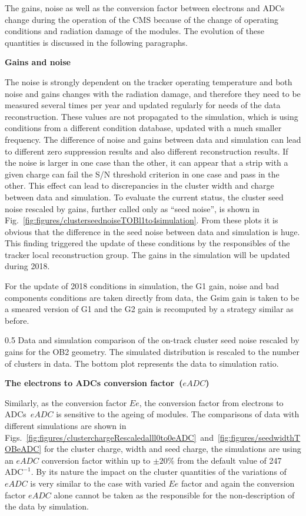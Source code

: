 The gains, noise as well as the conversion factor between electrons and ADCs change during the operation of the CMS because of the change of operating conditions and radiation damage of the modules. The evolution of these quantities is discussed in the following paragraphs.   
 
\textbf{Gains and noise}

The noise is strongly dependent on the tracker operating temperature and both noise and gains changes with the radiation damage, and therefore they need to be measured several times per year and updated regularly for needs of the data reconstruction. These values are not propagated to the simulation, which is using conditions from a different condition database, updated with a much smaller frequency. The difference of noise and gains between data and simulation can lead to different zero suppression results and also different reconstruction results. If the noise is larger in one case than the other, it can appear that a strip with a given charge can fail the S/N threshold criterion in one case and pass in the other. This effect can lead to discrepancies in the cluster width and charge between data and simulation. To evaluate the current status, the cluster seed noise rescaled by gains, further called only as ``seed noise'', is shown in Fig.~\ref{fig:figures/clusterseednoiseTOBl1to4simulation}. From these plots it is obvious that the difference in the seed noise between data and simulation is huge. This finding triggered the update of these conditions by the responsibles of the tracker local reconstruction group. The gains in the simulation will be updated during 2018.

For the update of 2018 conditions in simulation, the G1 gain, noise and bad components conditions are taken directly from data, the Gsim gain is taken to be a smeared version of G1 and the G2 gain is recomputed by a strategy similar as before.

                 {0.5}       %
                 { Data and simulation comparison of the on-track cluster seed noise rescaled by gains for the OB2 geometry. The simulated distribution is rescaled to the number of clusters in data. The bottom plot represents the data to simulation ratio. }


\textbf{The electrons to ADCs conversion factor~($eADC$)}

Similarly, as the conversion factor $Ee$, the conversion factor from electrons to ADCs~$eADC$ is sensitive to the ageing of modules. The comparisons of data with different simulations are shown in Figs.~\ref{fig:figures/clusterchargeRescaledalll0to0eADC}~and~\ref{fig:figures/seedwidthTOBeADC} for the cluster charge, width and seed charge, the simulations are using an $eADC$ conversion factor within up to $\pm 20\%$ from the default value of 247~$\mathrm{ADC^{-1}}$. By its nature the impact on the cluster quantities of the variations of $eADC$ is very similar to the case with varied $Ee$ factor and again the conversion factor $eADC$ alone cannot be taken as the responsible for the non-description of the data by simulation. 

